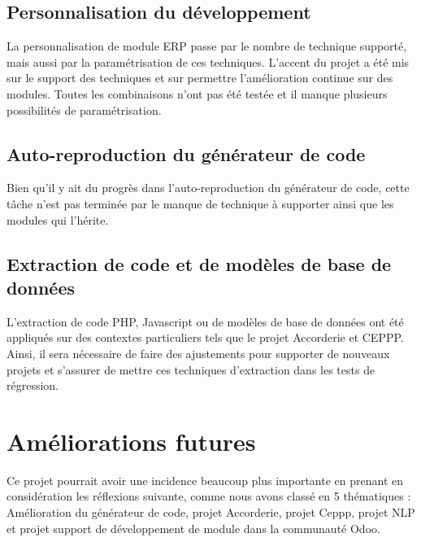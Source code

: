 \subsection{Personnalisation du développement}
La personnalisation de module ERP passe par le nombre de technique supporté, mais aussi par la paramétrisation de ces techniques. L'accent du projet a été mis sur le support des techniques et sur permettre l'amélioration continue sur des modules. Toutes les combinaisons n'ont pas été testée et il manque plusieurs possibilités de paramétrisation.

\subsection{Auto-reproduction du générateur de code}
Bien qu'il y ait du progrès dans l'auto-reproduction du générateur de code, cette tâche n'est pas terminée par le manque de technique à supporter ainsi que les modules qui l'hérite.

\subsection{Extraction de code et de modèles de base de données}
L'extraction de code PHP, Javascript ou de modèles de base de données ont été appliqués sur des contextes particuliers tels que le projet Accorderie et CEPPP. Ainsi, il sera nécessaire de faire des ajustements pour supporter de nouveaux projets et s'assurer de mettre ces techniques d'extraction dans les tests de régression.

\section{Améliorations futures}

Ce projet pourrait avoir une incidence beaucoup plus importante en prenant en considération les réflexions suivante, comme nous avons classé en 5 thématiques : Amélioration du générateur de code, projet Accorderie, projet Ceppp, projet NLP et projet support de développement de module dans la communauté Odoo.

